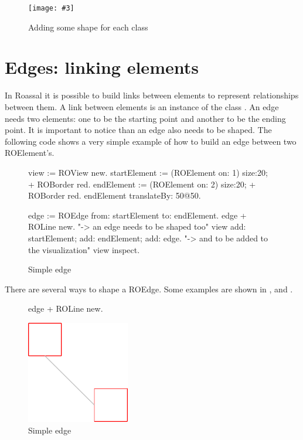 \documentclass[a4paper,10pt,twoside]{book}
\newcommand{\fig}[4]{
		\begin{figure}[#1]
			\centering
			\texttt{[image: \#3]}
			\caption{\label{fig:#3}#4}
		\end{figure}}
\begin{document}
\fig{H}{0.6}{hier2}{Adding some shape for each class}


\section{Edges: linking elements} 

In Roassal it is possible to build links between elements to represent relationships between them. A link between elements is an instance of the class . An edge needs two elements: one to be the starting point and another to be the ending point. It is important to notice than an edge also needs to be shaped. The following code shows a very simple example of how to build an edge between two ROElement's.


\begin{figure}[H]
 \begin{code}{}
view := ROView new.
startElement := (ROElement on: 1) size:20; + ROBorder red.
endElement := (ROElement on: 2)  size:20; + ROBorder red.
endElement translateBy: 50@50.

edge := ROEdge from: startElement to: endElement.
edge + ROLine new. "-> an edge needs to be shaped too"
view 
	add: startElement; 
	add: endElement; 
	add: edge. "-> and to be added to the visualization"
view inspect.
\end{code}   
\caption{Simple edge}
\label{fig:simpleEdge}
\end{figure} 

There are several ways to shape a ROEdge. Some examples are shown in ,  and .

\begin{figure}[H]
      \begin{minipage}[t]{0.5\textwidth}
      \vspace{0pt}
     \begin{code}{}
edge + ROLine new. \end{code}
   \end{minipage}
   \hfill
   \begin{minipage}[t]{0.4\textwidth}
      \vspace{0pt} \raggedright
       \centering
		\includegraphics[width=0.4\textwidth]{line}
   \end{minipage}
\caption{Simple edge}
\label{fig:line}
\end{figure} 
\end{document}
